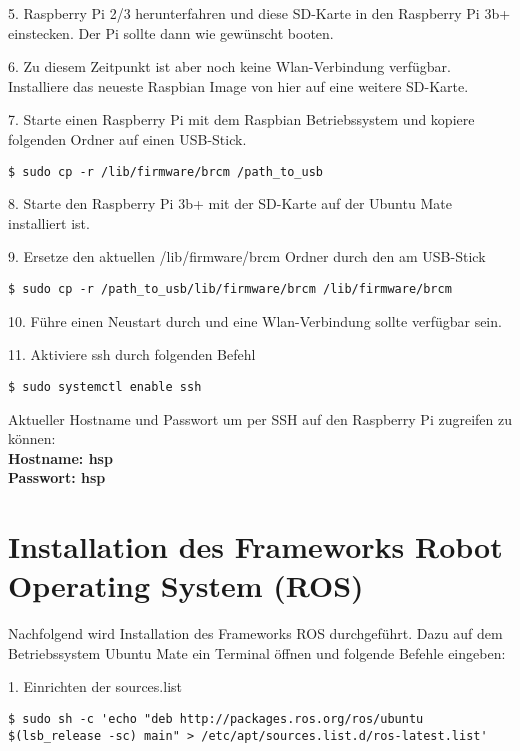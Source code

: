 5. Raspberry Pi 2/3 herunterfahren und diese SD-Karte in den Raspberry Pi 3b+ einstecken. Der Pi sollte dann wie gewünscht booten. 

6. Zu diesem Zeitpunkt ist aber noch keine Wlan-Verbindung verfügbar. Installiere das neueste Raspbian Image von hier auf eine weitere SD-Karte. 

7. Starte einen Raspberry Pi mit dem Raspbian Betriebssystem und kopiere folgenden Ordner auf einen USB-Stick.\\

\begin{lstlisting}
$ sudo cp -r /lib/firmware/brcm /path_to_usb
\end{lstlisting}

8. Starte den Raspberry Pi 3b+ mit der SD-Karte auf der Ubuntu Mate installiert ist. 

9. Ersetze den aktuellen /lib/firmware/brcm Ordner durch den am USB-Stick\\

\begin{lstlisting}
$ sudo cp -r /path_to_usb/lib/firmware/brcm /lib/firmware/brcm
\end{lstlisting}

10. Führe einen Neustart durch und eine Wlan-Verbindung sollte verfügbar sein.

11. Aktiviere ssh durch folgenden Befehl\\

\begin{lstlisting}
$ sudo systemctl enable ssh
\end{lstlisting}


Aktueller Hostname und Passwort um per SSH auf den Raspberry Pi zugreifen zu können:\\
\textbf{Hostname: hsp}\\
\textbf{Passwort: hsp}

\section{Installation des Frameworks Robot Operating System (ROS)}

Nachfolgend wird Installation des Frameworks ROS durchgeführt. Dazu auf dem Betriebssystem Ubuntu Mate ein Terminal öffnen und folgende Befehle eingeben:

1. Einrichten der sources.list\\

\begin{lstlisting}
$ sudo sh -c 'echo "deb http://packages.ros.org/ros/ubuntu $(lsb_release -sc) main" > /etc/apt/sources.list.d/ros-latest.list'
\end{lstlisting}

